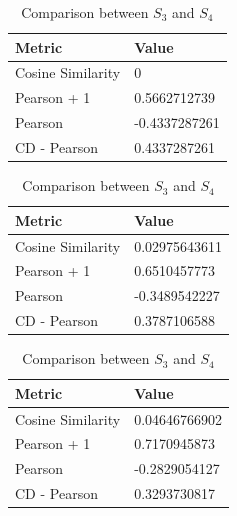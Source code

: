 \begin{table}[!htb]
    \begin{subtable}{.5\linewidth}
        \centering
        
            \begin{tabular}{ll}
            \hline
            Metric            & Value         \\
            \hline
            Cosine Similarity & 0             \\
            Pearson + 1       & 0.5662712739  \\
            Pearson           & -0.4337287261 \\
            CD - Pearson      & 0.4337287261  \\
            \hline
            \end{tabular} 
            \caption{Comparison between $S_1$ and $S_2$} 
            
            \begin{tabular}{ll}
            \\
            \hline
            Metric            & Value         \\
            \hline
            Cosine Similarity & 0.02975643611 \\
            Pearson + 1       & 0.6510457773  \\
            Pearson           & -0.3489542227 \\
            CD - Pearson      & 0.3787106588  \\
            \hline
            \end{tabular}
            \caption{Comparison between $S_2$ and $S_3$}
            
            \begin{tabular}{ll}
            \\
            \hline
            Metric            & Value         \\
            \hline
            Cosine Similarity & 0.04646766902 \\
            Pearson + 1       & 0.7170945873  \\
            Pearson           & -0.2829054127 \\
            CD - Pearson      & 0.3293730817  \\
            \hline
            \end{tabular}\\
            \\
            \caption{Comparison between $S_3$ and $S_4$}\\
            \\
            

\end{subtable}
\end{table}

